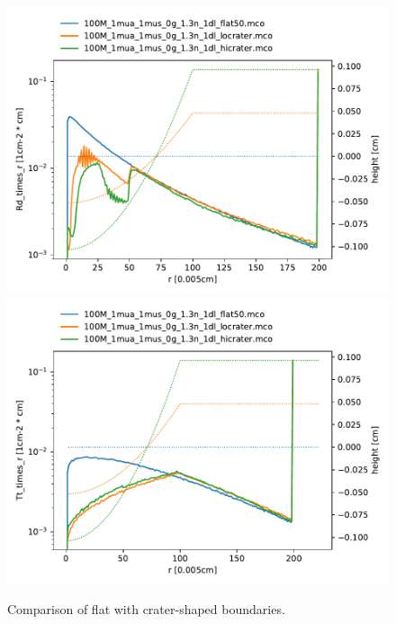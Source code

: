 \documentclass[]{article}
\begin{document}
\begin{figure}[ht!]
	\includegraphics[width=\linewidth]{img/crater_R.pdf}
	\includegraphics[width=\linewidth]{img/crater_T.pdf}
	\caption{Comparison of flat with crater-shaped boundaries.}
	\label{results:fig:crater}
\end{figure}
\end{document}
